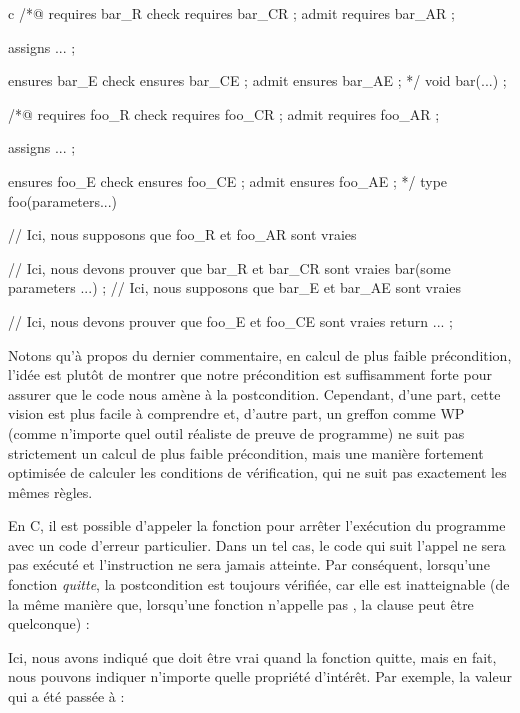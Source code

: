 \begin{CodeBlock}{c}
/*@       requires bar_R
    check requires bar_CR ;
    admit requires bar_AR ;

    assigns ... ;

          ensures bar_E
    check ensures bar_CE ;
    admit ensures bar_AE ;
*/
void bar(...) ;

/*@       requires foo_R
    check requires foo_CR ;
    admit requires foo_AR ;

    assigns ... ;

          ensures foo_E
    check ensures foo_CE ;
    admit ensures foo_AE ;
*/
type foo(parameters...){
  // Ici, nous supposons que foo_R et foo_AR sont vraies


  // Ici, nous devons prouver que bar_R et bar_CR sont vraies
  bar(some parameters ...) ;
  // Ici, nous supposons que bar_E et bar_AE sont vraies


  // Ici, nous devons prouver que foo_E et foo_CE sont vraies
  return ... ;
}
\end{CodeBlock}


Notons qu'à propos du dernier commentaire, en calcul de plus faible précondition,
l'idée est plutôt de montrer que notre précondition est suffisamment forte pour assurer
que le code nous amène à la postcondition. Cependant, d'une part, cette vision
est plus facile à comprendre et, d'autre part, un greffon comme WP (comme n'importe
quel outil réaliste de preuve de programme) ne suit pas strictement un calcul
de plus faible précondition, mais une manière fortement optimisée de calculer les
conditions de vérification, qui ne suit pas exactement les mêmes règles.




En C, il est possible d'appeler la fonction  pour arrêter
l'exécution du programme avec un code d'erreur particulier. Dans un tel cas, le
code qui suit l'appel ne sera pas exécuté et l'instruction 
ne sera jamais atteinte. Par conséquent, lorsqu'une fonction \textit{quitte},
la postcondition est toujours vérifiée, car elle est inatteignable (de la même
manière que, lorsqu'une fonction n'appelle pas , la clause
 peut être quelconque) :




Ici, nous avons indiqué que  doit être vrai
quand la fonction quitte, mais en fait, nous pouvons indiquer n'importe quelle
propriété d'intérêt. Par exemple, la valeur qui a été passée à
 :


